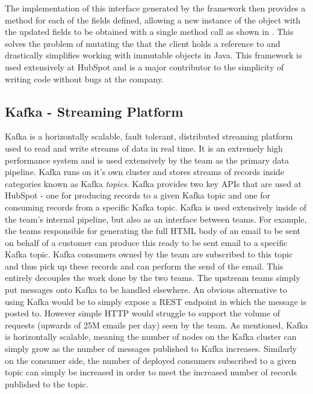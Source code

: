 

The implementation of this interface generated by the framework then provides a  method for each of the fields defined, allowing a new instance of the object with the updated fields to be obtained with a single method call as shown in . This solves the problem of mutating the  that the client holds a reference to and drastically simplifies working with immutable objects in Java. This framework is used extensively at HubSpot and is a major contributor to the simplicity of writing code without bugs at the company.




\subsection{Kafka - Streaming Platform}\label{sec:kafka}
Kafka \cite{kafka} is a horizontally scalable, fault tolerant, distributed streaming platform used to read and write streams of data in real time. It is an extremely high performance system and is used extensively by the \team{} team as the primary data pipeline. Kafka runs on it's own cluster and stores streams of records inside categories known as Kafka \textit{topics}. Kafka provides two key APIs that are used at HubSpot - one for producing records to a given Kafka topic and one for consuming records from a specific Kafka topic. Kafka is used extensively inside of the team's internal pipeline, but also as an interface between teams. For example, the teams responsible for generating the full HTML body of an email to be sent on behalf of a customer can produce this ready to be sent email to a specific Kafka topic. Kafka consumers owned by the \team{} team are subscribed to this topic and thus pick up these records and can perform the send of the email. This entirely decouples the work done by the two teams. The upstream teams simply put messages onto Kafka to be handled elsewhere. An obvious alternative to using Kafka would be to simply expose a REST endpoint in which the message is posted to. However simple HTTP would struggle to support the volume of requests (upwards of 25M emails per day) seen by the \team{} team. As mentioned, Kafka is horizontally scalable, meaning the number of nodes on the Kafka cluster can simply grow as the number of messages published to Kafka increases. Similarly on the consumer side, the number of deployed consumers subscribed to a given topic can simply be increased in order to meet the increased number of records published to the topic.

